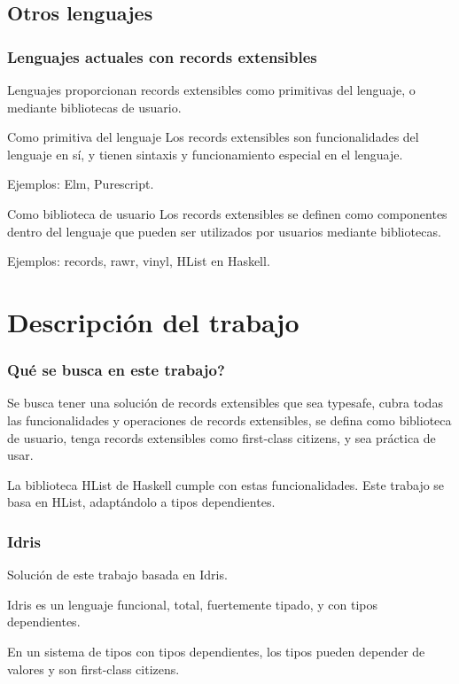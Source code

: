 \documentclass{beamer}
\begin{document}
\subsection{Otros lenguajes}

\begin{frame}
\frametitle{Lenguajes actuales con records extensibles}

Lenguajes proporcionan records extensibles como primitivas del lenguaje, o mediante bibliotecas de usuario.

\pause

\begin{block}{Como primitiva del lenguaje}
Los records extensibles son funcionalidades del lenguaje en sí, y tienen sintaxis y funcionamiento especial en el lenguaje.

Ejemplos: Elm, Purescript.
\end{block}

\pause

\begin{block}{Como biblioteca de usuario}
Los records extensibles se definen como componentes dentro del lenguaje que pueden ser utilizados por usuarios mediante bibliotecas.

Ejemplos: records, rawr, vinyl, HList en Haskell.
\end{block}


\end{frame}

\section{Descripción del trabajo}

\begin{frame}
\frametitle{Qué se busca en este trabajo?}

Se busca tener una solución de records extensibles que sea typesafe, cubra todas las funcionalidades y operaciones de records extensibles, se defina como biblioteca de usuario, tenga records extensibles como first-class citizens, y sea práctica de usar.

\pause

La biblioteca HList de Haskell cumple con estas funcionalidades. Este trabajo se basa en HList, adaptándolo a tipos dependientes.

\end{frame}

\begin{frame}
\frametitle{Idris}

Solución de este trabajo basada en Idris.

Idris es un lenguaje funcional, total, fuertemente tipado, y con tipos dependientes.

En un sistema de tipos con tipos dependientes, los tipos pueden depender de valores y son first-class citizens.
\end{frame}
\end{document}

